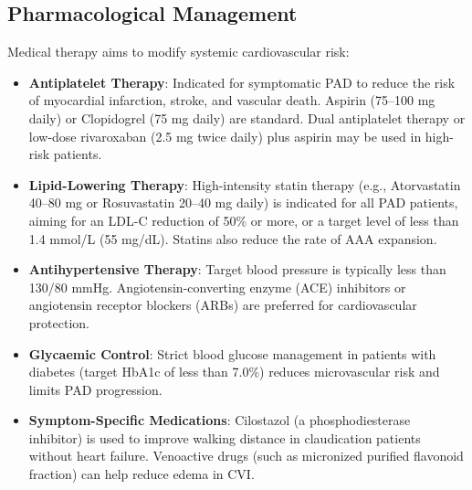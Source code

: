 \subsection*{Pharmacological Management}
Medical therapy aims to modify systemic cardiovascular risk:
\begin{itemize}
    \item \textbf{Antiplatelet Therapy}: Indicated for symptomatic PAD to reduce the risk of myocardial infarction, stroke, and vascular death. Aspirin (75--100 mg daily) or Clopidogrel (75 mg daily) are standard. Dual antiplatelet therapy or low-dose rivaroxaban (2.5 mg twice daily) plus aspirin may be used in high-risk patients.
    \item \textbf{Lipid-Lowering Therapy}: High-intensity statin therapy (e.g., Atorvastatin 40--80 mg or Rosuvastatin 20--40 mg daily) is indicated for all PAD patients, aiming for an LDL-C reduction of 50\% or more, or a target level of less than 1.4 mmol/L (55 mg/dL). Statins also reduce the rate of AAA expansion.
    \item \textbf{Antihypertensive Therapy}: Target blood pressure is typically less than 130/80 mmHg. Angiotensin-converting enzyme (ACE) inhibitors or angiotensin receptor blockers (ARBs) are preferred for cardiovascular protection.
    \item \textbf{Glycaemic Control}: Strict blood glucose management in patients with diabetes (target HbA1c of less than 7.0\%) reduces microvascular risk and limits PAD progression.
    \item \textbf{Symptom-Specific Medications}: Cilostazol (a phosphodiesterase inhibitor) is used to improve walking distance in claudication patients without heart failure. Venoactive drugs (such as micronized purified flavonoid fraction) can help reduce edema in CVI.
\end{itemize}

